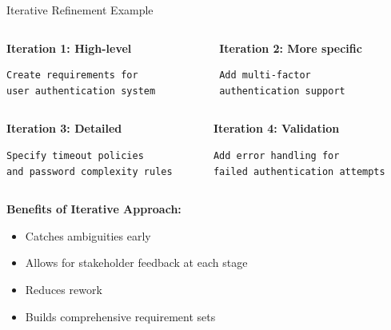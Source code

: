 \documentclass{beamer}
\begin{document}
\begin{frame}[fragile]{Iterative Refinement Example}
    \begin{columns}
        \begin{column}{0.5\textwidth}
            \textbf{Iteration 1: High-level}
            \begin{lstlisting}[style=code]
Create requirements for 
user authentication system
            \end{lstlisting}
        \end{column}
        \begin{column}{0.5\textwidth}
            \textbf{Iteration 2: More specific}
            \begin{lstlisting}[style=code]
Add multi-factor 
authentication support
            \end{lstlisting}
        \end{column}
    \end{columns}
    
    \vspace{0.3cm}
    \begin{columns}
        \begin{column}{0.5\textwidth}
            \textbf{Iteration 3: Detailed}
            \begin{lstlisting}[style=code]
Specify timeout policies 
and password complexity rules
            \end{lstlisting}
        \end{column}
        \begin{column}{0.5\textwidth}
            \textbf{Iteration 4: Validation}
            \begin{lstlisting}[style=code]
Add error handling for 
failed authentication attempts
            \end{lstlisting}
        \end{column}
    \end{columns}
    
    \vspace{0.5cm}
    \textbf{Benefits of Iterative Approach:}
    \begin{itemize}
        \item Catches ambiguities early
        \item Allows for stakeholder feedback at each stage
        \item Reduces rework
        \item Builds comprehensive requirement sets
    \end{itemize}
\end{frame}
\end{document}
